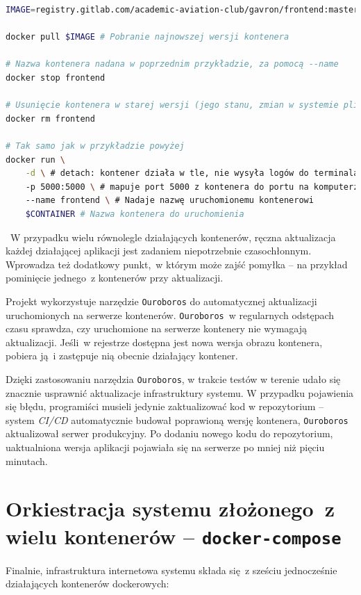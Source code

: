 \begin{lstlisting}[language=bash, label=list:docker_update_container,caption={Aktualizacja kontenerów}, basicstyle=\footnotesize\ttfamily]
IMAGE=registry.gitlab.com/academic-aviation-club/gavron/frontend:master

docker pull $IMAGE # Pobranie najnowszej wersji kontenera

# Nazwa kontenera nadana w poprzednim przykładzie, za pomocą --name
docker stop frontend

# Usunięcie kontenera w starej wersji (jego stanu, zmian w systemie plików)
docker rm frontend

# Tak samo jak w przykładzie powyżej
docker run \
    -d \ # detach: kontener działa w tle, nie wysyła logów do terminala
    -p 5000:5000 \ # mapuje port 5000 z kontenera do portu na komputerze  
    --name frontend \ # Nadaje nazwę uruchomionemu kontenerowi
    $CONTAINER # Nazwa kontenera do uruchomienia 
\end{lstlisting}
~W przypadku wielu równolegle działających kontenerów, ręczna aktualizacja 
każdej działającej aplikacji jest zadaniem niepotrzebnie czasochłonnym.
Wprowadza też dodatkowy punkt,~w którym może zajść pomyłka -- na przykład
pominięcie jednego~z kontenerów przy aktualizacji.

Projekt wykorzystuje narzędzie \texttt{Ouroboros} do automatycznej aktualizacji
uruchomionych na serwerze kontenerów. \texttt{Ouroboros}~w regularnych odstępach
czasu sprawdza, czy uruchomione na serwerze kontenery nie wymagają aktualizacji.
Jeśli~w rejestrze dostępna jest nowa wersja obrazu kontenera, pobiera ją~i zastępuje
nią obecnie działający kontener.

Dzięki zastosowaniu narzędzia \texttt{Ouroboros}, w trakcie testów w terenie 
udało się znacznie usprawnić aktualizacje infrastruktury systemu. W przypadku
pojawienia się błędu, programiści musieli jedynie zaktualizować kod w repozytorium --
system \textit{CI/CD} automatycznie budował poprawioną wersję kontenera, \texttt{Ouroboros}
aktualizował serwer produkcyjny. Po dodaniu nowego kodu do repozytorium, uaktualniona
wersja aplikacji pojawiała się na serwerze po mniej niż pięciu minutach.

\section{Orkiestracja systemu złożonego~z wielu kontenerów -- \texttt{docker-compose}}

Finalnie, infrastruktura internetowa systemu składa się~z sześciu
jednocześnie działających kontenerów dockerowych:

